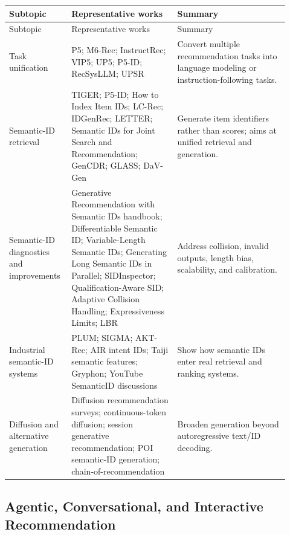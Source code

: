 \documentclass[11pt]{article}
\begin{document}
\small
\begin{longtable}{@{}p{0.18\linewidth}p{0.36\linewidth}p{0.38\linewidth}@{}}
\toprule
Subtopic & Representative works & Summary\\
\midrule
\endfirsthead
\toprule
Subtopic & Representative works & Summary\\
\midrule
\endhead
Task unification & P5; M6-Rec; InstructRec; VIP5; UP5; P5-ID; RecSysLLM; UPSR & Convert multiple recommendation tasks into language modeling or instruction-following tasks.\\
Semantic-ID retrieval & TIGER; P5-ID; How to Index Item IDs; LC-Rec; IDGenRec; LETTER; Semantic IDs for Joint Search and Recommendation; GenCDR; GLASS; DaV-Gen & Generate item identifiers rather than scores; aims at unified retrieval and generation.\\
Semantic-ID diagnostics and improvements & Generative Recommendation with Semantic IDs handbook; Differentiable Semantic ID; Variable-Length Semantic IDs; Generating Long Semantic IDs in Parallel; SIDInspector; Qualification-Aware SID; Adaptive Collision Handling; Expressiveness Limits; LBR & Address collision, invalid outputs, length bias, scalability, and calibration.\\
Industrial semantic-ID systems & PLUM; SIGMA; AKT-Rec; AIR intent IDs; Taiji semantic features; Gryphon; YouTube SemanticID discussions & Show how semantic IDs enter real retrieval and ranking systems.\\
Diffusion and alternative generation & Diffusion recommendation surveys; continuous-token diffusion; session generative recommendation; POI semantic-ID generation; chain-of-recommendation & Broaden generation beyond autoregressive text/ID decoding.\\
\bottomrule
\end{longtable}
\normalsize

\subsection{Agentic, Conversational, and Interactive Recommendation}
\end{document}
